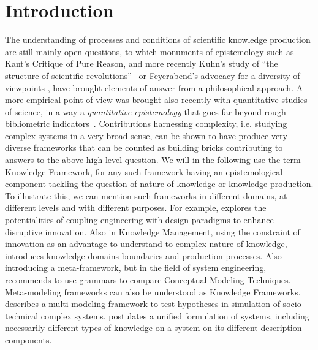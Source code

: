 \documentclass[runningheads,a4paper]{llncs2e/llncs}
\begin{document}
\section{Introduction}


The understanding of processes and conditions of scientific knowledge production are still mainly open questions, to which monuments of epistemology such as Kant's Critique of Pure Reason, and more recently Kuhn's study of ``the structure of scientific revolutions''~\cite{kuhn1970structure} or Feyerabend's advocacy for a diversity of viewpoints \cite{feyerabend1993against}, have brought elements of answer from a philosophical approach. A more empirical point of view was brought also recently with quantitative studies of science, in a way a \emph{quantitative epistemology} that goes far beyond rough bibliometric indicators~\cite{cronin2014beyond}. Contributions harnessing complexity, i.e. studying complex systems in a very broad sense, can be shown to have produce very diverse frameworks that can be counted as building bricks contributing to answers to the above high-level question. We will in the following use the term Knowledge Framework, for any such framework having an epistemological component tackling the question of nature of knowledge or knowledge production. To illustrate this, we can mention such frameworks in different domains, at different levels and with different purposes. For example, \cite{durantin2017disruptive} explores the potentialities of coupling engineering with design paradigms to enhance disruptive innovation. Also in Knowledge Management, using the constraint of innovation as an advantage to understand to complex nature of knowledge, \cite{carlile2004transferring} introduces knowledge domains boundaries and production processes. Also introducing a meta-framework, but in the field of system engineering, \cite{gemino2004framework} recommends to use grammars to compare Conceptual Modeling Techniques. Meta-modeling frameworks can also be understood as Knowledge Frameworks. \cite{cottineau2015modular} describes a multi-modeling framework to test hypotheses in simulation of socio-technical complex systems. \cite{golden2012modeling} postulates a unified formulation of systems, including necessarily different types of knowledge on a system on its different description components.
 
\end{document}
